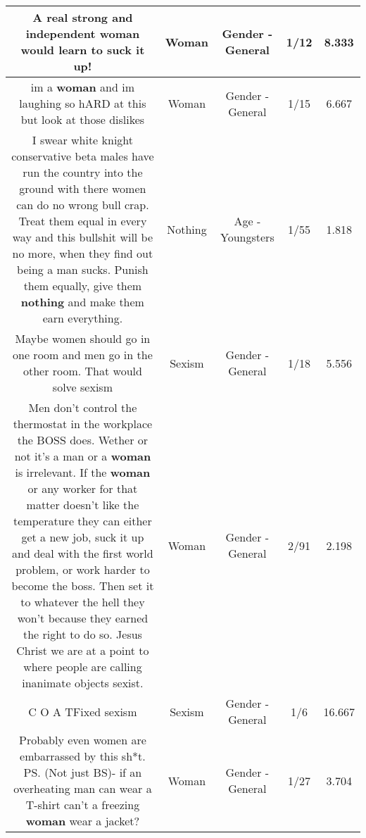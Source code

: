 \documentclass[11pt]{article}
\newlength\mylength
\begin{document}
\begin{center}
\begin{longtable}{|C{.65\mylength}|C{.30\mylength}|C{.12\mylength}|C{.12\mylength}|C{.12\mylength}|}
  \small A real strong and independent \textbf{woman} would learn to suck it up!\normalsize   & Woman & Gender - General & 1/12 & 8.333 \\  \hline
  \small im a \textbf{woman} and im laughing so hARD at this but look at those dislikes\normalsize   & Woman & Gender - General & 1/15 & 6.667 \\  \hline
  \small I swear white knight conservative beta males have run the country into the ground with there women can do no wrong bull crap. Treat them equal in every way and this bullshit will be no more, when they find out being a man sucks. Punish them equally, give them \textbf{nothing} and make them earn everything.\normalsize   & Nothing & Age - Youngsters & 1/55 & 1.818 \\  \hline
  \small Maybe women should go in one room and men go in the other room.  That would solve sexism\normalsize   & Sexism & Gender - General & 1/18 & 5.556 \\  \hline
  \small Men don't control the thermostat in the workplace the BOSS does. Wether or not it's a man or a \textbf{woman} is irrelevant. If the \textbf{woman} or any worker for that matter doesn't like the temperature they can either get a new job, suck it up and deal with the first world problem, or work harder to become the boss. Then set it to whatever the hell they won't because they earned the right to do so. Jesus Christ we are at a point to where people are calling inanimate objects sexist.\normalsize   & Woman & Gender - General & 2/91 & 2.198 \\  \hline
  \small C O A TFixed sexism\normalsize   & Sexism & Gender - General & 1/6 & 16.667 \\  \hline
  \small Probably even women are embarrassed by this sh*t. PS. (Not just BS)- if an overheating man can wear a T-shirt can't a freezing \textbf{woman} wear a jacket?\normalsize   & Woman & Gender - General & 1/27 & 3.704 \\  \hline

\end{longtable}
\end{center}
\end{document}
